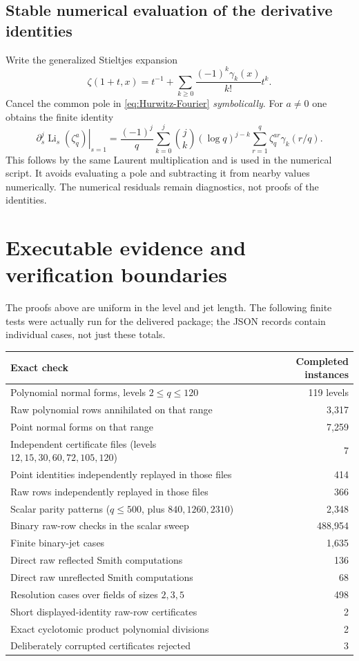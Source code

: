 \documentclass[11pt]{article}
\numberwithin{equation}{section}
\theoremstyle{definition}
\theoremstyle{remark}
\DeclareMathOperator{\Li}{Li}
\begin{document}
\subsection{Stable numerical evaluation of the derivative identities}
Write the generalized Stieltjes expansion
\[
 \zeta(1+t,x)=t^{-1}+\sum_{k\ge0}\frac{(-1)^k\gamma_k(x)}{k!}t^k.
\]
Cancel the common pole in \eqref{eq:Hurwitz-Fourier} \emph{symbolically}.
For $a\ne0$ one obtains the finite identity
\begin{equation}
 \left.\partial_s^j\Li_s(\zeta_q^a)\right|_{s=1}
 =\frac{(-1)^j}{q}\sum_{k=0}^{j}\binom jk(\log q)^{j-k}
            \sum_{r=1}^{q}\zeta_q^{ar}\gamma_k(r/q).
 \label{eq:Stieltjes-evaluator}
\end{equation}
This follows by the same Laurent multiplication and is used in the
numerical script. It avoids evaluating a pole and subtracting it from
nearby values numerically. The numerical residuals remain diagnostics,
not proofs of the identities.

\section{Executable evidence and verification boundaries}
\label{sec:verification}
The proofs above are uniform in the level and jet length. The following
finite tests were actually run for the delivered package; the JSON
records contain individual cases, not just these totals.
\begin{center}
\small
\begin{tabular}{@{}p{.62\linewidth}r@{}}
\toprule
Exact check & Completed instances\\
\midrule
Polynomial normal forms, levels $2\le q\le120$ &119 levels\\
Raw polynomial rows annihilated on that range &3,317\\
Point normal forms on that range &7,259\\
Independent certificate files (levels $12,15,30,60,72,105,120$)&7\\
Point identities independently replayed in those files &414\\
Raw rows independently replayed in those files &366\\
Scalar parity patterns ($q\le500$, plus $840,1260,2310$)&2,348\\
Binary raw-row checks in the scalar sweep &488,954\\
Finite binary-jet cases &1,635\\
Direct raw reflected Smith computations &136\\
Direct raw unreflected Smith computations &68\\
Resolution cases over fields of sizes $2,3,5$ &498\\
Short displayed-identity raw-row certificates &2\\
Exact cyclotomic product polynomial divisions &2\\
Deliberately corrupted certificates rejected &3\\
\bottomrule
\end{tabular}
\end{center}
\end{document}
